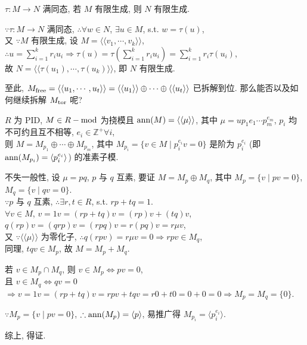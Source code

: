 \documentclass{note}
\begin{document}
\begin{cor}\label{cor-1 for thm-6.8}
    $\tau:M\rightarrow N$ 满同态, 若 $M$ 有限生成, 则 $N$ 有限生成.
\end{cor}
\begin{pf}
    $\because\tau:M\rightarrow N$ 满同态, $\therefore\forall w\in N$, $\exists u\in M$, s.t. $w=\tau(u)$,\\
    又 $\because M$ 有限生成, 设 $M=\langle\langle v_1,\cdots,v_k\rangle\rangle$, $\therefore u=\sum_{i=1}^kr_iu_i\Longrightarrow\tau(u)=\tau\left(\sum_{i=1}^kr_iu_i\right)=\sum_{i=1}^kr_i\tau(u_i)$,\\
    故 $N=\langle\langle\tau(u_1),\cdots,\tau(u_k)\rangle\rangle$, 即 $N$ 有限生成.
\end{pf}

至此, $M_{\operatorname{free}}=\langle\langle u_1,\cdots,u_t\rangle\rangle=\langle\langle u_1\rangle\rangle\oplus\cdots\oplus\langle\langle u_t\rangle\rangle$ 已拆解到位. 那么能否以及如何继续拆解 $M_{\operatorname{tor}}$ 呢?

\begin{thm}[(课本定理 6.10)]\label{thm-6.10}
    $R$ 为 PID, $M\in R-\operatorname{mod}$ 为挠模且 $\operatorname{ann}(M)=\langle\langle\mu\rangle\rangle$, 其中 $\mu=up_1{e_1}\cdots p_m^{e_m}$, $p_i$ 均不可约且互不相等, $e_i\in\mathbb{Z}^+\forall i$,\\
    则 $M=M_{p_1}\oplus\cdots\oplus M_{p_m}$, 其中 $M_{p_i}=\{v\in M\mid p_i^{e_i}v=0\}$ 是阶为 $p_i^{e_i}$ (即 $\operatorname{ann}(M_{p_i})=\langle p_i^{e_i}\rangle$) 的准素子模.
\end{thm}
\begin{pf}
    不失一般性, 设 $\mu=pq$, $p$ 与 $q$ 互素, 要证 $M=M_p\oplus M_q$, 其中 $M_p=\{v\mid pv=0\}$, $M_q=\{v\mid qv=0\}$.\\
    $\because p$ 与 $q$ 互素, $\therefore\exists r,t\in R$, s.t. $rp+tq=1$.\\
    $\forall v\in M$, $v=1v=(rp+tq)v=(rp)v+(tq)v$,\\
    $q(rp)v=(qrp)v=(rpq)v=r(pq)v=r\mu v$,\\
    又 $\because\langle\langle\mu\rangle\rangle$ 为零化子, $\therefore q(rpv)=r\mu v=0\Longrightarrow rpv\in M_q$,\\
    同理, $tqv\in M_p$, 故 $M=M_p+M_q$.

    若 $v\in M_p\cap M_q$, 则 $v\in M_p\Longleftrightarrow pv=0$,\\
    且 $v\in M_q\Longleftrightarrow qv=0$\\
    $\Longrightarrow v=1v=(rp+tq)v=rpv+tqv=r0+t0=0+0=0\Longrightarrow M_p=M_q=\{0\}$.

    $\because M_p=\{v\mid pv=0\}$, $\therefore\operatorname{ann}(M_{p})=\langle p\rangle$, 易推广得 $M_{p_i}=\langle p_i^{e_i}\rangle$.

    综上, 得证.
\end{pf}
\end{document}
